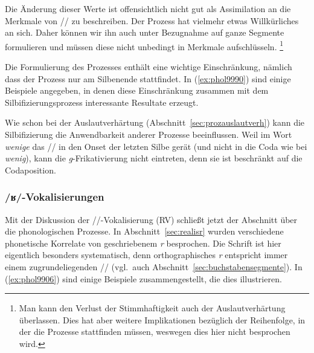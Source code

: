 Die Änderung dieser Werte ist offensichtlich nicht gut als Assimilation an die Merkmale von // zu beschreiben.
Der Prozess hat vielmehr etwas Willkürliches an sich.
Daher können wir ihn auch unter Bezugnahme auf ganze Segmente formulieren und müssen diese nicht unbedingt in Merkmale aufschlüsseln.%
\footnote{Man kann den Verlust der Stimmhaftigkeit auch der Auslautverhärtung überlassen.
Dies hat aber weitere Implikationen bezüglich der Reihenfolge, in der die Prozesse stattfinden müssen, weswegen dies hier nicht besprochen wird.}


Die Formulierung des Prozesses enthält eine wichtige Einschränkung, nämlich dass der Prozess nur am Silbenende stattfindet.
In (\ref{ex:phol9990}) sind einige Beispiele angegeben, in denen diese Einschränkung zusammen mit dem Silbifizierungsprozess interessante Resultate erzeugt.

\begin{exe}
  \ex\label{ex:phol9990}
  \begin{xlist}
  \end{xlist}
\end{exe}

Wie schon bei der Auslautverhärtung (Abschnitt~\ref{sec:prozauslautverh}) kann die Silbifizierung die Anwendbarkeit anderer Prozesse beeinflussen.
Weil im Wort \textit{wenige} das // in den Onset der letzten Silbe gerät (und nicht in die Coda wie bei \textit{wenig}), kann die \textit{g}-Frikativierung nicht eintreten, denn sie ist beschränkt auf die Codaposition.

\subsubsection{/ʁ/-Vokalisierungen}

\label{sec:prozrvok}

Mit der Diskussion der //-Vo\-ka\-li\-sie\-rung (RV) schließt jetzt der Abschnitt über die phonologischen Prozesse.
In Abschnitt~\ref{sec:realisr} wurden verschiedene phonetische Korrelate von geschriebenem \textit{r} besprochen.
Die Schrift ist hier eigentlich besonders systematisch, denn orthographisches \textit{r} entspricht immer einem zugrundeliegenden // (vgl.\ auch Abschnitt~\ref{sec:buchstabensegmente}).
In (\ref{ex:phol9906}) sind einige Beispiele zusammengestellt, die dies illustrieren.

